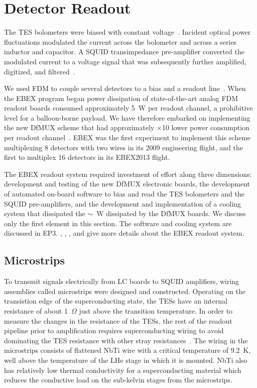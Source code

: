 \documentclass[../EBEXPaper2.tex]{subfiles}
\begin{document}
\section{Detector Readout}
\label{sec:detector_readout}

The \ac{TES} bolometers were biased with constant voltage~\citep{lee_appliedoptics_1998}.
Incident optical power fluctuations modulated the current across the bolometer and across a series inductor and capacitor.
A \ac{SQUID} transimpedance pre-amplifier converted the modulated current to a voltage signal that was subsequently further amplified, digitized, and filtered~\citep{yoon_apl_2001}.

We used \ac{FDM} to couple several detectors to a bias and a readout line~\citep{yoon_apl_2001}.
When the \ac{EBEX} program began power dissipation of state-of-the-art analog \ac{FDM} readout boards consumed approximately 5~W per readout channel, a prohibitive level for a balloon-borne payload.
We have therefore embarked on implementing the new \ac{DfMUX} scheme that had approximately $\times$10 lower power consumption per readout channel~\citep{dobbs_ieee_2008}.
\ac{EBEX} was the first experiment to implement this scheme multiplexing 8 detectors with two wires in its 2009 engineering flight, and the first to multiplex 16 detectors in its \ac{EBEX2013} flight. 

The \ac{EBEX} readout system required investment of effort along three dimensions:  development and testing of the new \ac{DfMUX} electronic boards, the development of automated on-board software to bias and read the \ac{TES} bolometers and the \ac{SQUID} pre-amplifiers, and the development and implementation of a cooling system that dissipated the $\sim$\PinBRC~W dissipated by the \ac{DfMUX} boards.
We discuss only the first element in this section.
The software and cooling system are discussed in \ac{EP3}.   
\citet{Aubin_TESReadout2010}, \citet{MacDermid_SPIE2014}, \citet{MacDermid_thesis}, and \citet{aubin_thesis} give more details about the \ac{EBEX} readout system. 

\subsection{Microstrips} 

To transmit signals electrically from LC boards to \ac{SQUID} amplifiers, wiring assemblies called microstrips were designed and constructed.
Operating on the transistion edge of the superconducting state, the \ac{TES}s have an internal resistance of about 1~$\Omega$ just above the transition temperature.
In order to measure the changes in the resistance of the \ac{TES}s, the rest of the readout pipeline prior to amplification requires superconducting wiring to avoid dominating the \ac{TES} resistance with other stray resistances~\citep{dobbs_revSciInst_2012}.
The wiring in the microstrips consists of flattened NbTi wire with a critical temperature of 9.2~K, well above the temperature of the LHe stage in which it is mounted.
NbTi also has relatively low thermal conductivity for a superconducting material which reduces the conductive load on the sub-kelvin stages from the microstrips.
\end{document}
